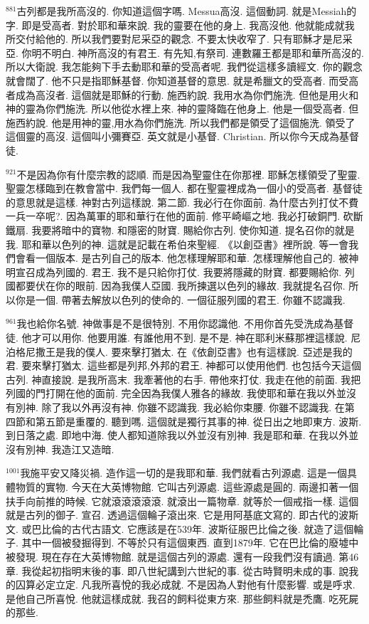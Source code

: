 \documentclass{book}
\begin{document}
$^{881}$古列都是我所高沒的.
你知道這個字嗎.
Messua高沒.
這個動詞.
就是Messiah的字.
即是受高者.
對於耶和華來說.
我的靈要在他的身上.
我高沒他.
他就能成就我所交付給他的.
所以我們要對尼采亞的觀念.
不要太快收窄了.
只有耶穌才是尼采亞.
你明不明白.
神所高沒的有君王.
有先知,有祭司.
連數羅王都是耶和華所高沒的.
所以大衛說.
我怎能夠下手去動耶和華的受高者呢.
我們從這樣多讀經文.
你的觀念就會闊了.
他不只是指耶穌基督.
你知道基督的意思.
就是希臘文的受高者.
而受高者成為高沒者.
這個就是耶穌的行動.
施西約說.
我用水為你們施洗.
但他是用火和神的靈為你們施洗.
所以他從水裡上來.
神的靈降臨在他身上.
他是一個受高者.
但施西約說.
他是用神的靈,用水為你們施洗.
所以我們都是領受了這個施洗.
領受了這個靈的高沒.
這個叫小彌賽亞.
英文就是小基督.
Christian.
所以你今天成為基督徒.

$^{921}$不是因為你有什麼宗教的認順.
而是因為聖靈住在你那裡.
耶穌怎樣領受了聖靈.
聖靈怎樣臨到在教會當中.
我們每一個人.
都在聖靈裡成為一個小的受高者.
基督徒的意思就是這樣.
神對古列這樣說.
第二節.
我必行在你面前.
為什麼古列打仗不費一兵一卒呢?.
因為萬軍的耶和華行在他的面前.
修平崎嶇之地.
我必打破銅門.
砍斷鐵扇.
我要將暗中的寶物.
和隱密的財寶.
賜給你古列.
使你知道.
提名召你的就是我.
耶和華以色列的神.
這就是記載在希伯來聖經.
《以創亞書》裡所說.
等一會我們會看一個版本.
是古列自己的版本.
他怎樣理解耶和華.
怎樣理解他自己的.
被神明宣召成為列國的.
君王.
我不是只給你打仗.
我要將隱藏的財寶.
都要賜給你.
列國都要伏在你的眼前.
因為我僕人亞國.
我所揀選以色列的緣故.
我就提名召你.
所以你是一個.
帶著去解放以色列的使命的.
一個征服列國的君王.
你雖不認識我.

$^{961}$我也給你名號.
神做事是不是很特別.
不用你認識他.
不用你首先受洗成為基督徒.
他才可以用你.
他要用誰.
有誰他用不到.
是不是.
神在耶利米蘇那裡這樣說.
尼泊格尼撒王是我的僕人.
要來擊打猶太.
在《依創亞書》也有這樣說.
亞述是我的君.
要來擊打猶太.
這些都是列邦,外邦的君王.
神都可以使用他們.
也包括今天這個古列.
神直接說.
是我所高末.
我牽著他的右手.
帶他來打仗.
我走在他的前面.
我把列國的門打開在他的面前.
完全因為我僕人雅各的緣故.
我使耶和華在我以外並沒有別神.
除了我以外再沒有神.
你雖不認識我.
我必給你束腰.
你雖不認識我.
在第四節和第五節是重覆的.
聽到嗎.
這個就是獨行其事的神.
從日出之地即東方.
波斯.
到日落之處.
即地中海.
使人都知道除我以外並沒有別神.
我是耶和華.
在我以外並沒有別神.
我造江又造暗.

$^{1001}$我施平安又降災禍.
造作這一切的是我耶和華.
我們就看古列源處.
這是一個具體物質的實物.
今天在大英博物館.
它叫古列源處.
這些源處是圓的.
兩邊扣著一個扶手向前推的時候.
它就滾滾滾滾滾.
就滾出一篇物章.
就等於一個戒指一樣.
這個就是古列的御子.
宣召.
透過這個輪子滾出來.
它是用阿基底文寫的.
即古代的波斯文.
或巴比倫的古代古語文.
它應該是在539年.
波斯征服巴比倫之後.
就造了這個輪子.
其中一個被發掘得到.
不等於只有這個東西.
直到1879年.
它在巴比倫的廢墟中被發現.
現在存在大英博物館.
就是這個古列的源處.
還有一段我們沒有讀過.
第46章.
我從起初指明末後的事.
即八世紀講到六世紀的事.
從古時賢明未成的事.
說我的囚算必定立定.
凡我所喜悅的我必成就.
不是因為人對他有什麼影響.
或是呼求.
是他自己所喜悅.
他就這樣成就.
我召的飼料從東方來.
那些飼料就是禿鷹.
吃死屍的那些.
\end{document}
